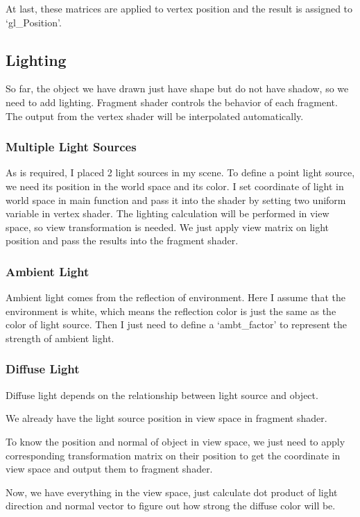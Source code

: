 \documentclass[acmtog]{acmart}
\begin{document}
At last, these matrices are applied to vertex position and the result is assigned to `gl\_Position'.


\subsection{Lighting}
So far, the object we have drawn just have shape but do not have shadow, so we need to add lighting.
Fragment shader controls the behavior of each fragment. The output from the vertex shader will be interpolated automatically.


\subsubsection{Multiple Light Sources}
As is required, I placed 2 light sources in my scene. To define a point light source, we need its position in the world space and its color. I set coordinate of light in world space in main function and pass it into the shader by setting two uniform variable in vertex shader. The lighting calculation will be performed in view space, so view transformation is needed. We just apply view matrix on light position and pass the results into the fragment shader.


\subsubsection{Ambient Light}
Ambient light comes from the reflection of environment. Here I assume that the environment is white, which means the reflection color is just the same as the color of light source. Then I just need to define a `ambt\_factor' to represent the strength of ambient light.


\subsubsection{Diffuse Light}
Diffuse light depends on the relationship between light source and object.

We already have the light source position in view space in fragment shader.

To know the position and normal of object in view space, we just need to apply corresponding transformation matrix on their position to get the coordinate in view space and output them to fragment shader.

Now, we have everything in the view space, just calculate dot product of light direction and normal vector to figure out how strong the diffuse color will be.
\end{document}
